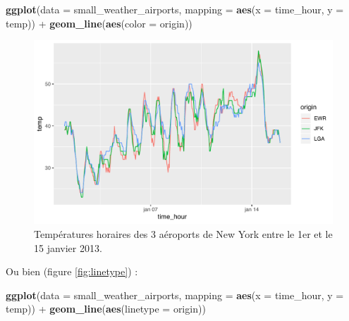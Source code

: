 \documentclass[a4paperpaper,]{article}
\newenvironment{Shaded}{\begin{snugshade}}{\end{snugshade}}
\newcommand{\DataTypeTok}[1]{\textcolor[rgb]{0.00,0.34,0.68}{#1}}
\newcommand{\KeywordTok}[1]{\textcolor[rgb]{0.12,0.11,0.11}{\textbf{#1}}}
\newcommand{\NormalTok}[1]{\textcolor[rgb]{0.12,0.11,0.11}{#1}}
\newcommand{\OperatorTok}[1]{\textcolor[rgb]{0.12,0.11,0.11}{#1}}
\newcommand{\StringTok}[1]{\textcolor[rgb]{0.75,0.01,0.01}{#1}}
\begin{document}
\begin{Shaded}
\begin{Highlighting}[]
\KeywordTok{ggplot}\NormalTok{(}\DataTypeTok{data =}\NormalTok{ small_weather_airports, }
       \DataTypeTok{mapping =} \KeywordTok{aes}\NormalTok{(}\DataTypeTok{x =}\NormalTok{ time_hour, }\DataTypeTok{y =}\NormalTok{ temp)) }\OperatorTok{+}
\StringTok{  }\KeywordTok{geom_line}\NormalTok{(}\KeywordTok{aes}\NormalTok{(}\DataTypeTok{color =}\NormalTok{ origin))}
\end{Highlighting}
\end{Shaded}

\begin{figure}[htpb]

{\centering \includegraphics[width=0.9\linewidth]{figure/linecolor-1} 

}

\caption{Températures horaires des 3 aéroports de New York entre le 1er et le 15 janvier 2013.}\label{fig:linecolor}
\end{figure}

Ou bien (figure \ref{fig:linetype}) :

\begin{Shaded}
\begin{Highlighting}[]
\KeywordTok{ggplot}\NormalTok{(}\DataTypeTok{data =}\NormalTok{ small_weather_airports, }
       \DataTypeTok{mapping =} \KeywordTok{aes}\NormalTok{(}\DataTypeTok{x =}\NormalTok{ time_hour, }\DataTypeTok{y =}\NormalTok{ temp)) }\OperatorTok{+}
\StringTok{  }\KeywordTok{geom_line}\NormalTok{(}\KeywordTok{aes}\NormalTok{(}\DataTypeTok{linetype =}\NormalTok{ origin))}
\end{Highlighting}
\end{Shaded}
\end{document}
